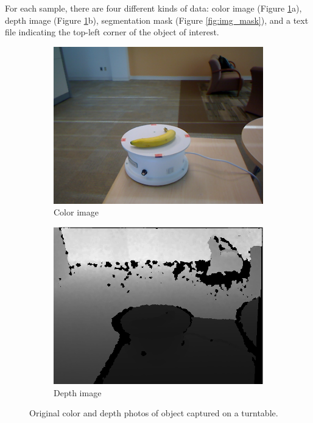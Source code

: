 For each sample, there are four different kinds of data: color image (Figure \ref{fig:orig_img}a), depth image (Figure \ref{fig:orig_img}b), segmentation mask (Figure \ref{fig:img_mask}), and a text file indicating the top-left corner of the object of interest.

\begin{figure}
	\centering
	\begin{subfigure}[b]{0.45\linewidth}
		\includegraphics[width=\textwidth]{img/banana_1_1_1.png}
		\caption{Color image}
	\end{subfigure}   	
	\begin{subfigure}[b]{0.45\linewidth}
		\includegraphics[width=\textwidth]{img/banana_1_1_1_depth.png}
		\caption{Depth image}
	\end{subfigure}
	\caption{Original color and depth photos of object captured on a turntable.}
	\label{fig:orig_img}
\end{figure}

